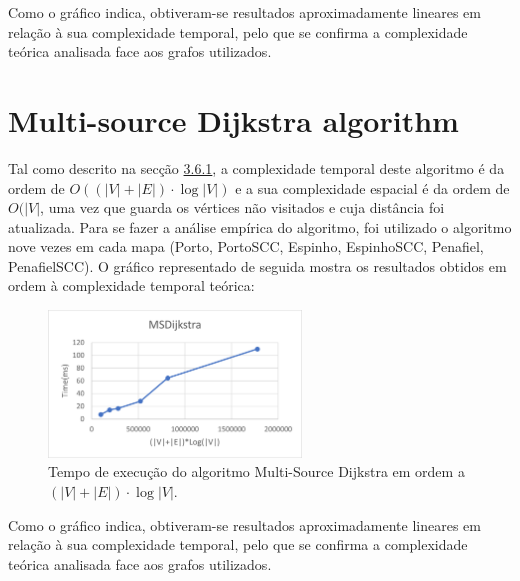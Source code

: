 \documentclass[12pt,a4paper]{report}
\begin{document}
Como o gráfico indica, obtiveram-se resultados aproximadamente lineares em relação à sua complexidade temporal, 
pelo que se confirma a complexidade teórica analisada face aos grafos utilizados.


\section{Multi-source Dijkstra algorithm}
Tal como descrito na secção \hyperref[algo:msdijkstra]{3.6.1}, a complexidade temporal deste algoritmo é da ordem de \( O((|V| + |E|)\cdot \log |V|) \) e a sua complexidade espacial
é da ordem de \(O(|V|\), uma vez que guarda os vértices não visitados e cuja distância foi atualizada.
Para se fazer a análise empírica do algoritmo, foi utilizado o algoritmo nove vezes em cada mapa (Porto, PortoSCC, Espinho, EspinhoSCC, Penafiel, PenafielSCC).
O gráfico representado de seguida mostra os resultados obtidos em ordem à complexidade temporal teórica:

\begin{figure}[H]
	\includegraphics[width=0.6\textwidth]{./imgs/charts/MSDijkstraTimeComplexity.png}
	\centering
	\caption{Tempo de execução do algoritmo Multi-Source Dijkstra em ordem a $ (|V|+|E|)\cdot \log |V|$.}
\end{figure}

Como o gráfico indica, obtiveram-se resultados aproximadamente lineares em relação à sua complexidade temporal, pelo que se confirma a complexidade teórica
analisada face aos grafos utilizados.
\end{document}
